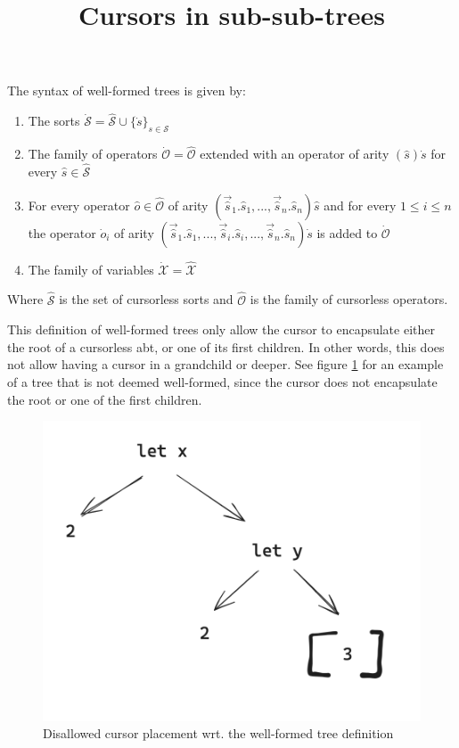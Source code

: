 \documentclass{article}
\title{Cursors in sub-sub-trees}
\date{}
\author{}
\begin{document}
\maketitle
The syntax of well-formed trees is given by:

\begin{enumerate}
    \item The sorts $\dot{\mathcal{S}} = \hat{\mathcal{S}} \cup \{ \dot{s} \}_{s \in \mathcal{S}}$
    \item The family of operators $\dot{\mathcal{O}} = \hat{\mathcal{O}}$ extended with an operator of arity $(\hat{s})\dot{s}$ for every $\hat{s} \in \hat{\mathcal{S}}$
    \item For every operator $\hat{o} \in \hat{\mathcal{O}}$ of arity $(\vec{\hat{s}}_1.\hat{s}_1,...,\vec{\hat{s}}_n.\hat{s}_n)\hat{s}$ and for every $1 \leq i \leq n$ the operator $\dot{o}_i$ of arity $(\vec{\hat{s}}_1.\hat{s}_1,...,\vec{\hat{s}}_i.\hat{s}_i,...,\vec{\hat{s}}_n.\hat{s}_n)\dot{s}$ is added to $\dot{\mathcal{O}}$
    \item The family of variables $\dot{\mathcal{X}} = \hat{\mathcal{X}}$
\end{enumerate}

Where $\hat{\mathcal{S}}$ is the set of cursorless sorts and $\hat{\mathcal{O}}$ is the family of cursorless operators.

This definition of well-formed trees only allow the cursor to encapsulate either the root of a cursorless abt, or one of its first children. In other words, this does not allow having a cursor in a grandchild or deeper. See figure \ref{fig:ex} for an example of a tree that is not deemed well-formed, since the cursor does not encapsulate the root or one of the first children.

\begin{figure}[H]
    \centering
    \includegraphics[scale=0.3]{img/not-well-formed-example.png}
    \caption{Disallowed cursor placement wrt. the well-formed tree definition}
    \label{fig:ex}
\end{figure}
\end{document}
